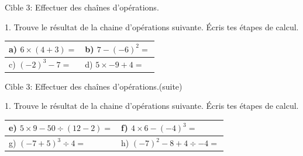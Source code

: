 \documentclass[11pt]{article}
\begin{document}
\vspace{5mm}



\newpage



\begin{cible}{Cible 3: Effectuer des chaînes d'opérations.}

1. Trouve le résultat de la chaine d'opérations suivante. Écris tes étapes de calcul.

\vspace{1cm}

\renewcommand{\arraystretch}{1}
\begin{tabular}{|p{7.7cm}|p{7.7cm}|}
\hline
\rule{0pt}{4mm} a) $6 \times (4+3) = $ & b) $7 - (-6)^2 = $ \\[8cm]
\hline
\rule{0pt}{4mm} c) $ (-2)^3 - 7 = $ & d) $5 \times -9 + 4 = $ \\[8cm]
\hline
\end{tabular}

\end{cible}

\newpage

\begin{cible}{Cible 3: Effectuer des chaînes d'opérations.(suite)}

1. Trouve le résultat de la chaine d'opérations suivante. Écris tes étapes de calcul.

\vspace{1cm}

\renewcommand{\arraystretch}{1}
\begin{tabular}{|p{7.7cm}|p{7.7cm}|}
\hline
\rule{0pt}{4mm} e) $5 \times 9 - 50 \div (12-2) = $ & f) $ 4 \times 6 - (-4)^3 = $ \\[8cm]
\hline
\rule{0pt}{4mm} g) $(-7+5)^3 \div 4 = $ & h) $(-7)^2 - 8 + 4 \div -4 = $ \\[8cm]
\hline
\end{tabular}

\end{cible}
\end{document}
